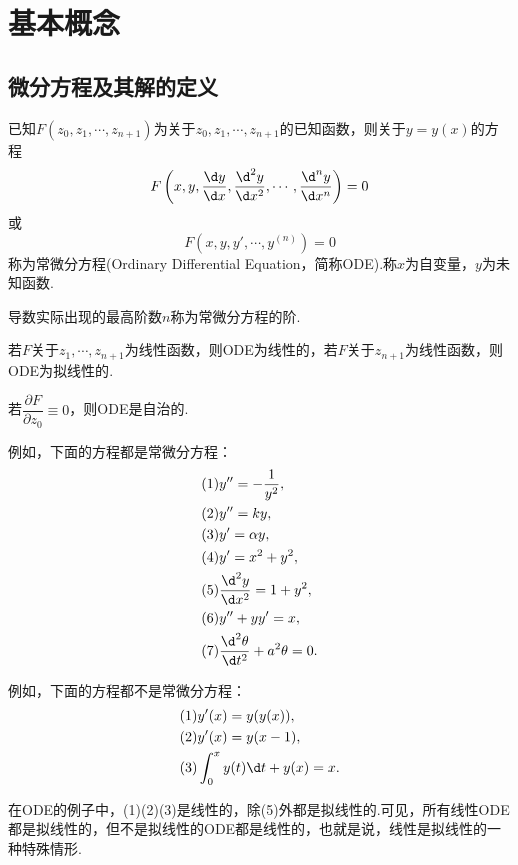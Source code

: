 \chapter{基本概念}
\section{微分方程及其解的定义}
\begin{definition}[常微分方程]
	已知$F(z_0,z_1,\cdots,z_{n+1})$为关于$z_0,z_1,\cdots,z_{n+1}$的已知函数，则关于$y=y(x)$的方程
	$$F\left(x,y,\frac{\d y}{\d x},\frac{\d^2y}{\d x^2},\cdots,\frac{\d^n y}{\d x^n}\right)=0$$
	或
	$$F(x,y,y',\cdots,y^{(n)})=0$$
	称为{\heiti 常微分方程}(Ordinary Differential Equation，简称ODE).称$x$为{\heiti 自变量}，$y$为{\heiti 未知函数}.
\end{definition}
\begin{remark}
	导数实际出现的最高阶数$n$称为常微分方程的{\heiti 阶}.
\end{remark}
\begin{remark}
	若$F$关于$z_1,\cdots,z_{n+1}$为线性函数，则ODE为{\heiti 线性的}，若$F$关于$z_{n+1}$为线性函数，则ODE为{\heiti 拟线性的}.
\end{remark}
\begin{remark}
	若$\dfrac{\partial F}{\partial z_0}\equiv 0$，则ODE是{\heiti 自治的}.
\end{remark}
\begin{example}
	例如，下面的方程都是常微分方程：
	\begin{align*}
		&(1)y''=-\frac{1}{y^2},\\
		&(2)y''=ky,\\
		&(3)y'=\alpha y,\\
		&(4)y'=x^2+y^2,\\
		&(5)\frac{\d^2 y}{\d x^2}=1+y^2,\\
		&(6)y''+yy'=x,\\
		&(7)\frac{\d^2\theta}{\d t^2}+a^2\theta=0.
	\end{align*}
\end{example}
\begin{example}
	例如，下面的方程都不是常微分方程：
	\begin{align*}
		&(1)y'(x)=y(y(x)),\\
		&(2)y'(x)=y(x-1),\\
		&(3)\int_{0}^{x}y(t)\d t+y(x)=x.
	\end{align*}
\end{example}
在ODE的例子中，(1)(2)(3)是线性的，除(5)外都是拟线性的.可见，所有线性ODE都是拟线性的，但不是拟线性的ODE都是线性的，也就是说，线性是拟线性的一种特殊情形.

